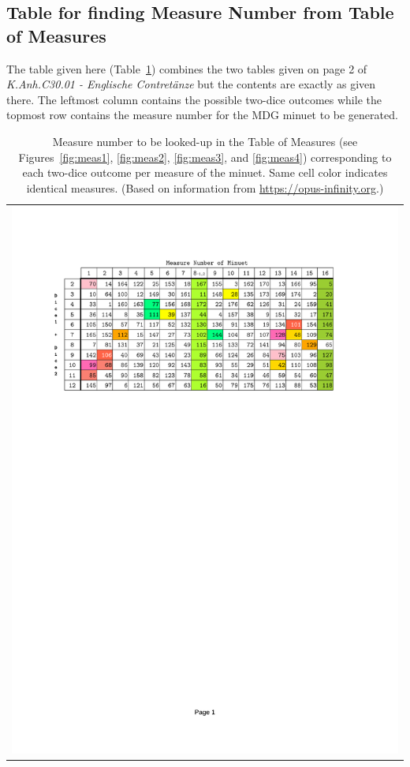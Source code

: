 \documentclass[letterpaper,x11names,svgnames,10pt]{article}
\begin{document}
\subsection{Table for finding Measure Number from Table of Measures}\label{tableFind}
The table given here (Table~\ref{fig:0tab1}) combines the two tables given on page 2 of {\it K.Anh.C30.01 - Englische Contret\"{a}nze} but the contents are exactly as given there.  The leftmost column contains the possible two-dice outcomes while the topmost row contains the measure number for the MDG minuet to be generated.

\begin{table}[H]
	\centering
	\begin{tabular}{c}
		\centering
		\includegraphics[clip=true,trim=0.90in 7.75in 1.25in 1.00in,scale=0.90]{0TAB1ECc}
	\end{tabular}
	\caption{Measure number to be looked-up in the Table of Measures (see Figures~\ref{fig:meas1}, \ref{fig:meas2}, \ref{fig:meas3}, and \ref{fig:meas4}) corresponding to each two-dice outcome per measure of the minuet. Same cell color indicates identical measures. (Based on information from \href{https://opus-infinity.org/dice_games/mozart_contredanse/tables/}{https://opus-infinity.org}.)}
	\label{fig:0tab1}
\end{table}
\end{document}
